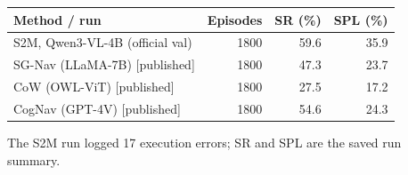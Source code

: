 \begin{tabular}{lrrr}
\toprule
Method / run & Episodes & SR (\%) & SPL (\%) \\
\midrule
S2M, Qwen3-VL-4B (official val) & 1800 & 59.6 & 35.9 \\
\midrule
SG-Nav (LLaMA-7B) [published] & 1800 & 47.3 & 23.7 \\
CoW (OWL-ViT) [published] & 1800 & 27.5 & 17.2 \\
CogNav (GPT-4V) [published] & 1800 & 54.6 & 24.3 \\
\bottomrule
\end{tabular}

\vspace{0.25em}\footnotesize The S2M run logged 17 execution errors; SR and SPL are the saved run summary.
